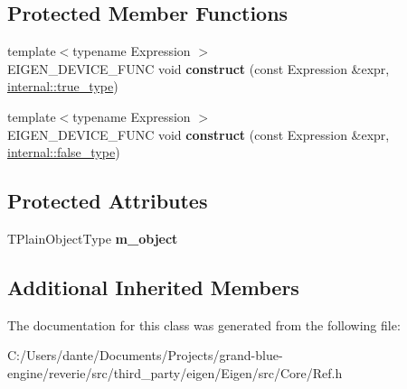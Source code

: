 \subsection*{Protected Member Functions}
\begin{DoxyCompactItemize}
\item 
\mbox{\label{class_eigen_1_1_ref_3_01const_01_t_plain_object_type_00_01_options_00_01_stride_type_01_4_ad72e94dc83764da0f163640b0ee5c77a}} 
{\footnotesize template$<$typename Expression $>$ }\\E\+I\+G\+E\+N\+\_\+\+D\+E\+V\+I\+C\+E\+\_\+\+F\+U\+NC void {\bfseries construct} (const Expression \&expr, \mbox{\hyperlink{struct_eigen_1_1internal_1_1true__type}{internal\+::true\+\_\+type}})
\item 
\mbox{\label{class_eigen_1_1_ref_3_01const_01_t_plain_object_type_00_01_options_00_01_stride_type_01_4_ab488e8547b27f8440132e3b8d8881f53}} 
{\footnotesize template$<$typename Expression $>$ }\\E\+I\+G\+E\+N\+\_\+\+D\+E\+V\+I\+C\+E\+\_\+\+F\+U\+NC void {\bfseries construct} (const Expression \&expr, \mbox{\hyperlink{struct_eigen_1_1internal_1_1false__type}{internal\+::false\+\_\+type}})
\end{DoxyCompactItemize}
\subsection*{Protected Attributes}
\begin{DoxyCompactItemize}
\item 
\mbox{\label{class_eigen_1_1_ref_3_01const_01_t_plain_object_type_00_01_options_00_01_stride_type_01_4_a717dd5ce1a92f509394fe4159cef5161}} 
T\+Plain\+Object\+Type {\bfseries m\+\_\+object}
\end{DoxyCompactItemize}
\subsection*{Additional Inherited Members}


The documentation for this class was generated from the following file\+:\begin{DoxyCompactItemize}
\item 
C\+:/\+Users/dante/\+Documents/\+Projects/grand-\/blue-\/engine/reverie/src/third\+\_\+party/eigen/\+Eigen/src/\+Core/Ref.\+h\end{DoxyCompactItemize}
